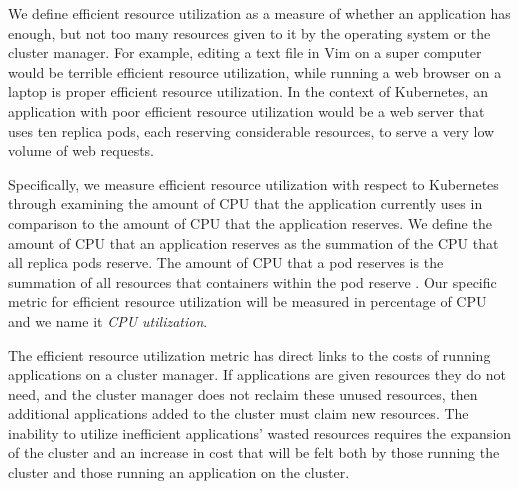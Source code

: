 We define efficient resource utilization as a measure of whether an application
has enough, but not too many resources given to it by the operating system or
the cluster manager. For example, editing a text file in Vim on a super computer
would be terrible efficient resource utilization, while running a web browser on
a laptop is proper efficient resource utilization. In the context of Kubernetes,
an application with poor efficient resource utilization would be a web server
that uses ten replica pods, each reserving considerable resources,
to serve a very low volume of web requests.

Specifically, we measure efficient resource utilization with respect to
Kubernetes through examining the amount of CPU that the application currently uses in
comparison to the amount of CPU that the application reserves. We define the
amount of CPU that an application reserves as the summation of the CPU that all
replica pods reserve. The amount of CPU that a pod reserves is the summation of
all resources that containers within the pod reserve
\cite{k8s-compute-resources}. Our specific metric for efficient resource
utilization will be measured in percentage of CPU and we name it \textit{CPU
utilization}.

The efficient resource utilization metric has direct links to the costs of
running applications on a cluster manager. If applications are given resources
they do not need, and the cluster manager does not reclaim these unused
resources, then additional applications added to the cluster must claim new
resources. The inability to utilize inefficient applications' wasted resources
requires the expansion of the cluster and an increase in cost that will be felt
both by those running the cluster and those running an application on the
cluster.
